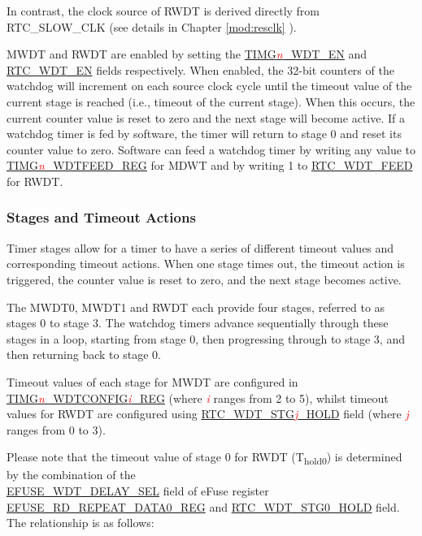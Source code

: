 \documentclass[main\_\_EN.tex]{subfiles}
\begin{document}
In contrast, the clock source of RWDT is derived directly from RTC\_SLOW\_CLK (see details in Chapter \ref{mod:resclk} \textit{}).

MWDT and RWDT are enabled by setting the \hyperref[fielddesc:TIMGWDTEN]{TIMG\textcolor{red}{\it{n}}\_WDT\_EN} and  \hyperref[fielddesc:RTCWDTEN]{RTC\_WDT\_EN} fields respectively. When enabled, the 32-bit counters of the watchdog will increment on each source clock cycle until the timeout value of the current stage is reached (i.e., timeout of the current stage). When this occurs, the current counter value is reset to zero and the next stage will become active. If a watchdog timer is fed by software, the timer will return to stage 0 and reset its counter value to zero. Software can feed a watchdog timer by writing any value to \hyperref[regdesc:TIMGWDTFEEDREG]{TIMG\textcolor{red}{\it{n}}\_WDTFEED\_REG} for MDWT and by writing 1 to \hyperref[fielddesc:RTCWDTRTCWDTFEED]{RTC\_WDT\_FEED} for RWDT.


\subsubsection{Stages and Timeout Actions}\label{sec:wdt-timeout}
Timer stages allow for a timer to have a series of different timeout values and corresponding timeout actions. When one stage times out, the timeout action is triggered, the counter value is reset to zero, and the next stage becomes active.


The MWDT0, MWDT1 and RWDT each provide four stages, referred to as stages 0 to stage 3. The watchdog timers advance sequentially through these stages in a loop, starting from stage 0, then progressing through to stage 3, and then returning back to stage 0.

Timeout values of each stage for MWDT are configured in \hyperref[regdesc:TIMGWDTCONFIG2REG]{TIMG\textcolor{red}{\it{n}}\_WDTCONFIG\textcolor{red}{\it{i}}\_REG} (where \textcolor{red}{\it{i}} ranges from 2 to 5), whilst timeout values for RWDT are configured using \hyperref[fielddesc:RTCWDTSTG3HOLD]{RTC\_WDT\_STG\textcolor{red}{\it{j}}\_HOLD} field (where \textcolor{red}{\it{j}} ranges from 0 to 3).

Please note that the timeout value of stage 0 for RWDT (T\textsubscript{hold0}) is determined by the combination of the \\ \hyperref[fielddesc:EFUSEWDTDELAYSEL]{EFUSE\_WDT\_DELAY\_SEL} field of eFuse register \hyperref[regdesc:EFUSERDREPEATDATA0REG]{EFUSE\_RD\_REPEAT\_DATA0\_REG} and  \hyperref[fielddesc:RTCWDTSTG0HOLD]{RTC\_WDT\_STG0\_HOLD} field. The relationship is as follows:
\end{document}
